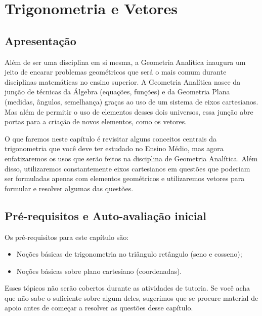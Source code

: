 \documentclass[main.tex]{subfiles}
\begin{document}
\paraAmbos

\chapter{Trigonometria e Vetores}

\section{Apresentação}

\paraAlunos

Além de ser uma disciplina em si mesma, a Geometria Analítica inaugura um jeito de encarar problemas geométricos que será o mais comum durante disciplinas matemáticas no ensino superior. A Geometria Analítica nasce da junção de técnicas da Álgebra (equações, funções) e da Geometria Plana (medidas, ângulos, semelhança) graças ao uso de um sistema de eixos cartesianos. Mas além de permitir o uso de elementos desses dois universos, essa junção abre portas para a criação de novos elementos, como os vetores.

O que faremos neste capítulo é revisitar alguns conceitos centrais da trigonometria que você deve ter estudado no Ensino Médio, mas agora enfatizaremos os usos que serão feitos na disciplina de Geometria Analítica. Além disso, utilizaremos constantemente eixos cartesianos em questões que poderiam ser formuladas apenas com elementos geométricos e utilizaremos vetores para formular e resolver algumas das questões.

\section{Pré-requisitos e Auto-avaliação inicial}

Os pré-requisitos para este capítulo são:
\begin{itemize}
 \item Noções básicas de trigonometria no triângulo retângulo (seno e cosseno);
 \item Noções básicas sobre plano cartesiano (coordenadas).
\end{itemize}

Esses tópicos não serão cobertos durante as atividades de tutoria. Se você acha que não sabe o suficiente sobre algum deles, sugerimos que se procure material de apoio antes de começar a resolver as questões desse capítulo.
\end{document}
